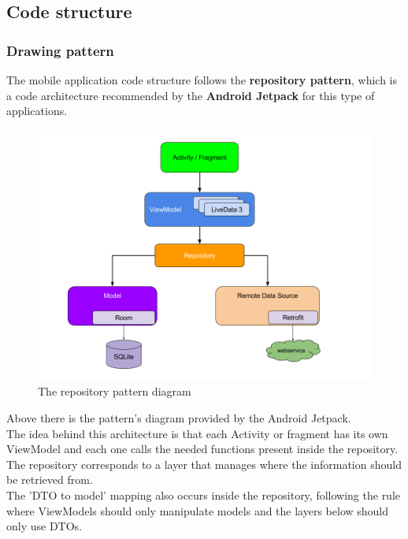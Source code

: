 \subsection{Code structure}

\subsubsection{Drawing pattern}

The mobile application code structure follows the \textbf{repository pattern}, which is a code architecture recommended by the \textbf{Android Jetpack} for this type of applications.\\

\begin{figure}[H]
    \begin{center}
        \includegraphics[scale=0.5]{_figures/repository_pattern2.png}
        \caption{The repository pattern diagram}
    \end{center}
\end{figure}

Above there is the pattern's diagram provided by the Android Jetpack.\\

The idea behind this architecture is that each Activity or fragment has its own ViewModel and each one calls the needed functions present inside the repository.
The repository corresponds to a layer that manages where the information should be retrieved from.\\

The 'DTO to model' mapping also occurs inside the repository, following the rule where ViewModels should only manipulate models and the layers below should only use DTOs.\\

